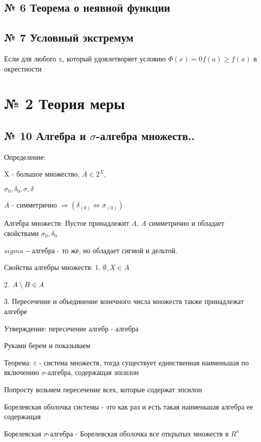 \documentclass{article}
\begin{document}
\subsection{ \footnotesize № 6 Теорема о неявной функции}

\subsection{ \footnotesize № 7 Условный экстремум}

Если для любого x, который удовлетворяет условию $\Phi (x) = 0 f(a) \geq f(x)$ в окрестности

\section{№ 2 Теория меры}

\subsection{ \footnotesize № 10 Алгебра и $\sigma$-алгебра множеств..}

Определение:

X - большое множество, $A \in 2^X$, 

$\sigma_0, \delta_0, \sigma, \delta$

$A$ - симметрично $\Rightarrow (\delta_{(0)} \Leftrightarrow \sigma_{(0)})$

Алгебра множеств: Пустое принадлежит $A$, $A$ симметрично и обладает свойствами $\sigma_0, \delta_0$

$sigma-$алгебра - то же, но обладает сигмой	и дельтой.

Свойства алгебры множеств: 1. $\emptyset, X \in A$

2. $A \setminus B \in \textit A$

3. Пересечение и объединение конечного числа множеств также принадлежат алгебре

Утверждение: пересечение алгебр - алгебра

Руками берем и показываем

Теорема: $\varepsilon$ - система множеств, тогда существует единственная наименьшая по включению $\sigma$-алгебра, содержащая эпсилон

Попросту возьмем пересечение всех, которые содержат эпсилон

Борелевская оболочка системы - это как раз и есть такая наименьшая алгебра ее содержащая

Борелевская $\sigma$-алгебра - Борелевская оболочка все открытых множеств в $R^n$
\end{document}
